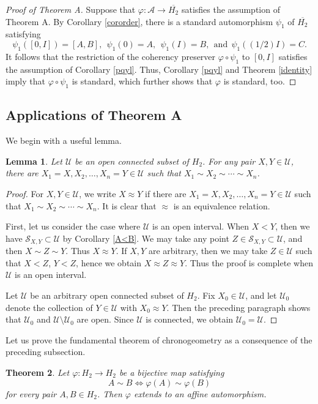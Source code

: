 \documentclass[10pt]{amsart}
\newtheorem{theorem}{Theorem}[section]
\newtheorem{lemma}[theorem]{Lemma}
\theoremstyle{definition}
\theoremstyle{remark}
\numberwithin{subsection}{section}
\numberwithin{equation}{section}
\newcommand\oH{{\overline{H_2}}}
\begin{document}
\begin{proof}[Proof of Theorem A]
Suppose that $\varphi\colon \mathcal{A}\to \oH$ satisfies the assumption of Theorem A.
By Corollary \ref{cororder}, there is a standard automorphism $\psi_1$ of $\oH$ satisfying 
\[
\psi_1([0,I])=[A, B],\ \ \psi_1(0)=A,\ \ \psi_1(I)=B, \ \ \text{and} \ \ \psi_1((1/2)I)=C.
\]
It follows that the restriction of the coherency preserver $\varphi\circ \psi_1$ to $[0,I]$ satisfies the assumption of Corollary \ref{pqyl}. 
Thus, Corollary \ref{pqyl} and Theorem \ref{identity} imply that $\varphi\circ \psi_1$ is standard, which further shows that $\varphi$ is standard, too.
\end{proof}



\subsection{Applications of Theorem A}\label{apply}
We begin with a useful lemma.
\begin{lemma}\label{path}
Let $\mathcal{U}$ be an open connected subset of $H_2$. 
For any pair $X, Y\in \mathcal{U}$, there are $X_1=X, X_2, \ldots, X_n=Y\in \mathcal{U}$ such that $X_1\sim X_2\sim \cdots\sim X_n$.
\end{lemma}
\begin{proof}
For $X, Y\in \mathcal{U}$, we write $X\approx Y$ if there are $X_1=X, X_2, \ldots, X_n=Y\in \mathcal{U}$ such that $X_1\sim X_2\sim \cdots\sim X_n$.
It is clear that $\approx$ is an equivalence relation.

First, let us consider the case where $\mathcal{U}$ is an open interval. 
When $X<Y$, then we have $\mathcal{S}_{X, Y}\subset \mathcal{U}$ by Corollary \ref{A<B}. We may take any point $Z\in \mathcal{S}_{X, Y}\subset \mathcal{U}$, and then $X\sim Z\sim Y$. Thus $X\approx Y$.  
If $X, Y$ are arbitrary, then we may take $Z\in \mathcal{U}$ such that $X< Z$, $Y< Z$, hence we obtain $X\approx Z\approx Y$. 
Thus the proof is complete when $\mathcal{U}$ is an open interval. 

Let $\mathcal{U}$ be an arbitrary open connected subset of $H_2$.
Fix $X_0\in \mathcal{U}$, and let $\mathcal{U}_0$ denote the collection of $Y\in \mathcal{U}$ with $X_0\approx Y$.
Then the preceding paragraph shows that $\mathcal{U}_0$ and $\mathcal{U}\setminus\mathcal{U}_0$ are open.
Since $\mathcal{U}$ is connected, we obtain $\mathcal{U}_0=\mathcal{U}$.
\end{proof}

Let us prove the fundamental theorem of chronogeometry  as a consequence of the preceding subsection.
\begin{theorem}\label{ftcgelem}
Let $\varphi \colon H_2 \to H_2$ be a bijective map satisfying 
\[
A \sim B \iff \varphi (A) \sim \varphi (B)
\]
for every pair $A,B \in H_2$. Then $\varphi$ extends to an affine automorphism. 
\end{theorem}
\end{document}
